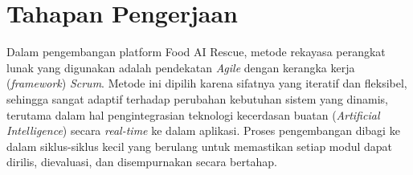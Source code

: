 
\section{Tahapan Pengerjaan}
Dalam pengembangan platform Food AI Rescue, metode rekayasa perangkat lunak yang digunakan adalah pendekatan \textit{Agile} dengan kerangka kerja (\textit{framework}) \textit{Scrum}. Metode ini dipilih karena sifatnya yang iteratif dan fleksibel, sehingga sangat adaptif terhadap perubahan kebutuhan sistem yang dinamis, terutama dalam hal pengintegrasian teknologi kecerdasan buatan (\textit{Artificial Intelligence}) secara \textit{real-time} ke dalam aplikasi. Proses pengembangan dibagi ke dalam siklus-siklus kecil yang berulang untuk memastikan setiap modul dapat dirilis, dievaluasi, dan disempurnakan secara bertahap.

